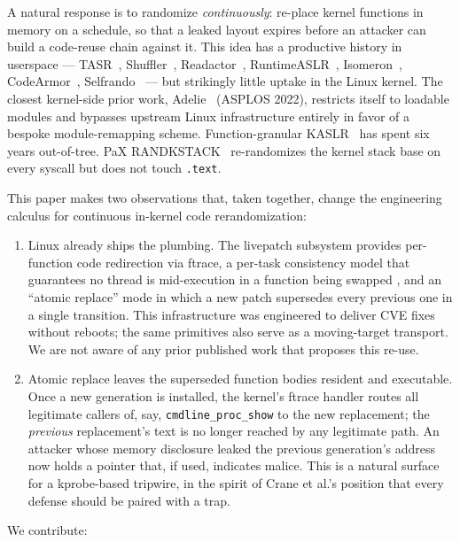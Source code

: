 \documentclass[10pt,letterpaper]{article}
\begin{document}
A natural response is to randomize \emph{continuously}: re-place
kernel functions in memory on a schedule, so that a leaked layout
expires before an attacker can build a code-reuse chain against it.
This idea has a productive history in userspace ---
TASR~\cite{tasr}, Shuffler~\cite{shuffler}, Readactor~\cite{readactor},
RuntimeASLR~\cite{runtimeaslr}, Isomeron~\cite{isomeron},
CodeArmor~\cite{codearmor}, Selfrando~\cite{selfrando} --- but
strikingly little uptake in the Linux kernel. The closest kernel-side
prior work, Adelie~\cite{adelie} (ASPLOS 2022), restricts itself to
loadable modules and bypasses upstream Linux infrastructure entirely
in favor of a bespoke module-remapping scheme. Function-granular
KASLR~\cite{fgkaslr} has spent six years out-of-tree. PaX
RANDKSTACK~\cite{pax_randkstack} re-randomizes the kernel stack base
on every syscall but does not touch \texttt{.text}.

This paper makes two observations that, taken together, change the
engineering calculus for continuous in-kernel code rerandomization:

\begin{enumerate}[leftmargin=*]
\item Linux already ships the plumbing. The livepatch subsystem
\cite{livepatch_docs} provides per-function code redirection via
ftrace, a per-task consistency model that guarantees no thread is
mid-execution in a function being swapped \cite{poimboeuf_consistency},
and an ``atomic replace'' mode in which a new patch supersedes every
previous one in a single transition. This infrastructure was engineered
to deliver CVE fixes without reboots; the same primitives also serve
as a moving-target transport. We are not aware of any prior published
work that proposes this re-use.

\item Atomic replace leaves the superseded function bodies resident
and executable. Once a new generation is installed, the kernel's
ftrace handler routes all legitimate callers of, say,
\texttt{cmdline\_proc\_show} to the new replacement; the
\emph{previous} replacement's text is no longer reached by any
legitimate path. An attacker whose memory disclosure leaked the
previous generation's address now holds a pointer that, if used,
indicates malice. This is a natural surface for a kprobe-based
tripwire, in the spirit of Crane et al.'s position
\cite{boobytrap} that every defense should be paired with a trap.
\end{enumerate}

We contribute:
\end{document}
